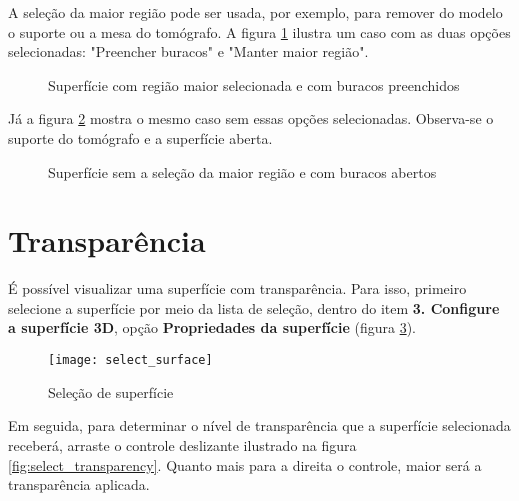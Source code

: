 
A seleção da maior região pode ser usada, por exemplo, para remover do modelo o suporte ou a
mesa do tomógrafo. A figura \ref{fig:surface_ex1} ilustra um caso com as duas opções
selecionadas: "Preencher buracos" e "Manter maior região".

\newpage

\begin{figure}
  \centering
  \caption{Superfície com região maior selecionada e com buracos preenchidos}
  \label{fig:surface_ex1}
\end{figure}


Já a figura \ref{fig:surface_ex2} mostra o mesmo caso sem essas opções selecionadas. Observa-se o
suporte do tomógrafo e a superfície aberta.


\begin{figure}
  \centering
  \caption{Superfície sem a seleção da maior região e com buracos abertos}
  \label{fig:surface_ex2}
\end{figure}

\newpage 

\section{Transparência}

É possível visualizar uma superfície com transparência. Para isso, primeiro selecione a
superfície por meio da lista de seleção, dentro do item \textbf{3. Configure a superfície 3D}, opção
\textbf{Propriedades da superfície} (figura \ref{fig:select_surface}).

\begin{figure}[!htb]
\centering
\texttt{[image: select\_surface]}
\caption{Seleção de superfície}
\label{fig:select_surface}
\end{figure}

Em seguida, para determinar o nível de transparência que a superfície selecionada receberá, arraste
o controle deslizante ilustrado na figura \ref{fig:select_transparency}. Quanto mais para a direita
o controle, maior será a transparência aplicada.

